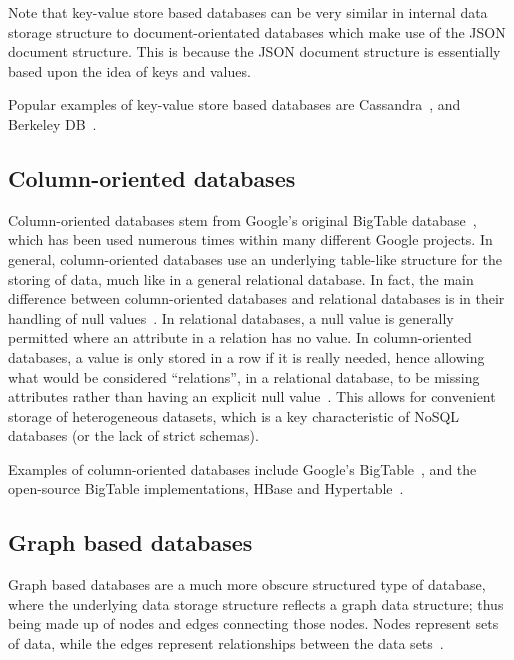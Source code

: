 \documentclass{article}
\begin{document}
Note that key-value store based databases can be very similar in internal data storage structure to
document-orientated databases which make use of the JSON document structure. This is because the JSON
document structure is essentially based upon the idea of keys and values.

Popular examples of key-value store based databases are Cassandra~\cite{3_cassandra.apache.org_2015},
and Berkeley DB~\cite{4_oracle.com_2015}.


\subsection{Column-oriented databases} %
\label{ssub:column_oriented}

Column-oriented databases stem from Google's original BigTable database~\cite{chang2008bigtable}, which
has been used numerous times within many different Google projects. In general, column-oriented databases
use an underlying table-like structure for the storing of data, much like in a general relational
database. In fact, the main difference between column-oriented databases and relational databases
is in their handling of null values~\cite{hecht2011nosql}. In relational databases, a null value
is generally permitted where an attribute in a relation has no value. In column-oriented databases,
a value is only stored in a row if it is really needed, hence allowing what would be considered
``relations'', in a relational database, to be missing attributes rather than having an explicit
null value~\cite{hecht2011nosql}. This allows for convenient storage of heterogeneous datasets,
which is a key characteristic of NoSQL databases (or the lack of strict schemas).

Examples of column-oriented databases include Google's BigTable~\cite{chang2008bigtable}, and
the open-source BigTable implementations, HBase and Hypertable~\cite{khetrapal2006hbase}.

\subsection{Graph based databases} %
\label{ssub:graph_based}

Graph based databases are a much more obscure structured type of database, where the underlying
data storage structure reflects a graph data structure; thus being made up of nodes and edges
connecting those nodes. Nodes represent sets of data, while the edges represent relationships
between the data sets~\cite{vicknair2010comparison}.
\end{document}

